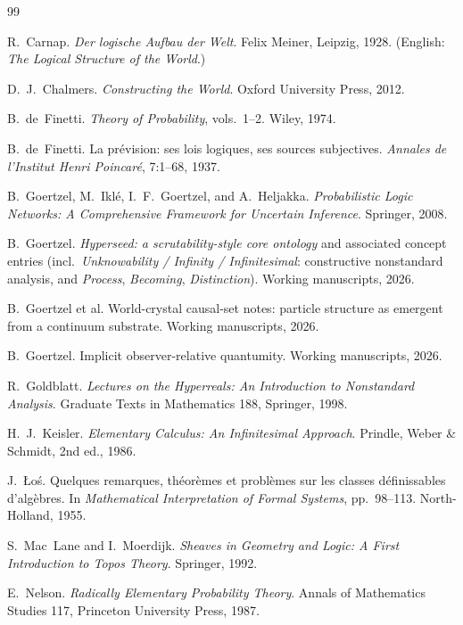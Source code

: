 \documentclass[]{article}
\theoremstyle{definition}
\theoremstyle{remark}
\begin{document}
\begin{thebibliography}{99}

 R.~Carnap. \emph{Der logische Aufbau der Welt}. Felix Meiner,
Leipzig, 1928. (English: \emph{The Logical Structure of the World}.)

 D.~J.~Chalmers. \emph{Constructing the World}. Oxford
University Press, 2012.

 B.~de~Finetti. \emph{Theory of Probability}, vols.~1--2.
Wiley, 1974.

 B.~de~Finetti. La pr\'evision: ses lois logiques, ses
sources subjectives. \emph{Annales de l'Institut Henri Poincar\'e}, 7:1--68, 1937.

 B.~Goertzel, M.~Ikl\'e, I.~F.~Goertzel, and A.~Heljakka.
\emph{Probabilistic Logic Networks: A Comprehensive Framework for Uncertain
Inference}. Springer, 2008.

 B.~Goertzel. \emph{Hyperseed: a scrutability-style core
ontology} and associated concept entries (incl.\ \emph{Unknowability / Infinity /
Infinitesimal}: constructive nonstandard analysis, and \emph{Process},
\emph{Becoming}, \emph{Distinction}). Working manuscripts, 2026.

 B.~Goertzel et al. World-crystal causal-set notes:
particle structure as emergent from a continuum substrate. Working manuscripts, 2026.

 B.~Goertzel. Implicit observer-relative quantumity.
Working manuscripts, 2026.

 R.~Goldblatt. \emph{Lectures on the Hyperreals: An
Introduction to Nonstandard Analysis}. Graduate Texts in Mathematics 188, Springer,
1998.

 H.~J.~Keisler. \emph{Elementary Calculus: An Infinitesimal
Approach}. Prindle, Weber \& Schmidt, 2nd ed., 1986.

 J.~{\L}o\'s. Quelques remarques, th\'eor\`emes et probl\`emes sur
les classes d\'efinissables d'alg\`ebres. In \emph{Mathematical Interpretation of
Formal Systems}, pp.~98--113. North-Holland, 1955.

 S.~Mac~Lane and I.~Moerdijk. \emph{Sheaves in Geometry
and Logic: A First Introduction to Topos Theory}. Springer, 1992.

 E.~Nelson. \emph{Radically Elementary Probability Theory}.
Annals of Mathematics Studies 117, Princeton University Press, 1987.


\end{thebibliography}
\end{document}
